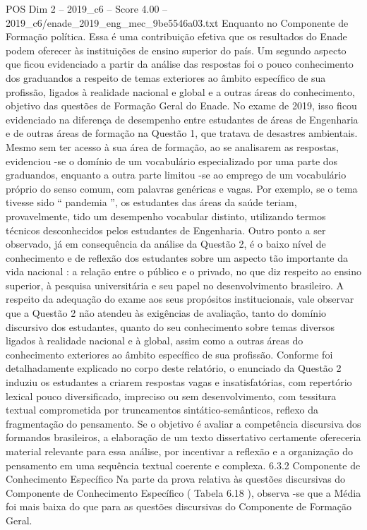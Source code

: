\begin{textsample}{POS Dim 2 – 2019\_c6 – Score 4.00 – 2019\_c6/enade\_2019\_eng\_mec\_9be5546a03.txt}
Enquanto no Componente de Formação política.
Essa é uma contribuição efetiva que os resultados do Enade podem oferecer às instituições de ensino superior do país.
Um segundo aspecto que ficou evidenciado a partir da análise das respostas foi o pouco conhecimento dos graduandos a respeito de temas exteriores ao âmbito específico de sua profissão, ligados à realidade nacional e global e a outras áreas do conhecimento, objetivo das questões de Formação Geral do Enade.
No exame de 2019, isso ficou evidenciado na diferença de desempenho entre estudantes de áreas de Engenharia e de outras áreas de formação na Questão 1, que tratava de desastres ambientais.
Mesmo sem ter acesso à sua área de formação, ao se analisarem as respostas, evidenciou -se o domínio de um vocabulário especializado por uma parte dos graduandos, enquanto a outra parte limitou -se ao emprego de um vocabulário próprio do senso comum, com palavras genéricas e vagas.
Por exemplo, se o tema tivesse sido “ pandemia ”, os estudantes das áreas da saúde teriam, provavelmente, tido um desempenho vocabular distinto, utilizando termos técnicos desconhecidos pelos estudantes de Engenharia.
Outro ponto a ser observado, já em consequência da análise da Questão 2, é o baixo nível de conhecimento e de reflexão dos estudantes sobre um aspecto tão importante da vida nacional : a relação entre o público e o privado, no que diz respeito ao ensino superior, à pesquisa universitária e seu papel no desenvolvimento brasileiro.
A respeito da adequação do exame aos seus propósitos institucionais, vale observar que a Questão 2 não atendeu às exigências de avaliação, tanto do domínio discursivo dos estudantes, quanto do seu conhecimento sobre temas diversos ligados à realidade nacional e à global, assim como a outras áreas do conhecimento exteriores ao âmbito específico de sua profissão.
Conforme foi detalhadamente explicado no corpo deste relatório, o enunciado da Questão 2 induziu os estudantes a criarem respostas vagas e insatisfatórias, com repertório lexical pouco diversificado, impreciso ou sem desenvolvimento, com tessitura textual comprometida por truncamentos sintático-semânticos, reflexo da fragmentação do pensamento.
Se o objetivo é avaliar a competência discursiva dos formandos brasileiros, a elaboração de um texto dissertativo certamente ofereceria material relevante para essa análise, por incentivar a reflexão e a organização do pensamento em uma sequência textual coerente e complexa. 6.3.2 Componente de Conhecimento Específico Na parte da prova relativa às questões discursivas do Componente de Conhecimento Específico ( Tabela 6.18 ), observa -se que a Média foi mais baixa do que para as questões discursivas do Componente de Formação Geral.

\end{textsample}

